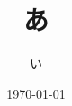 \documentclass[a4paper,11pt]{jsarticle}
\begin{document}
\title{あ}
\author{い}
\date{\today}
\maketitle
\end{document}
